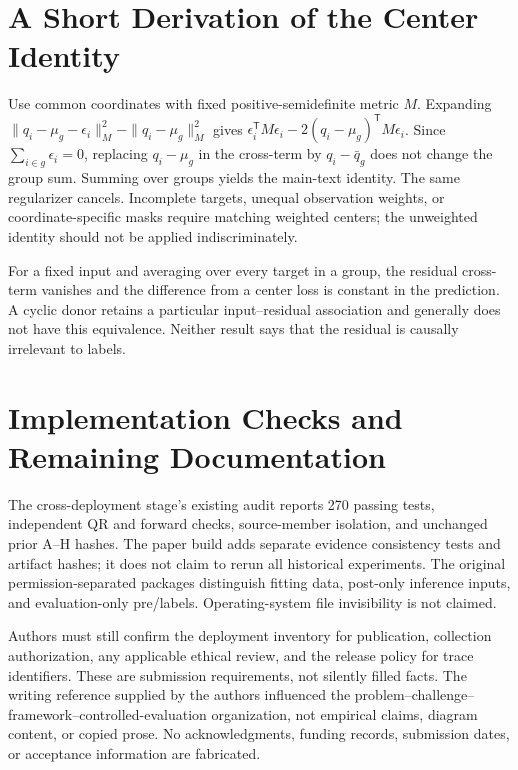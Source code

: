 \documentclass[journal]{IEEEtran}
\begin{document}
\section{A Short Derivation of the Center Identity}
Use common coordinates with fixed positive-semidefinite metric $M$. Expanding $\|q_i-\mu_g-\epsilon_i\|_M^2-\|q_i-\mu_g\|_M^2$ gives $\epsilon_i^{\mathsf T}M\epsilon_i-2(q_i-\mu_g)^{\mathsf T}M\epsilon_i$. Since $\sum_{i\in g}\epsilon_i=0$, replacing $q_i-\mu_g$ in the cross-term by $q_i-\bar q_g$ does not change the group sum. Summing over groups yields the main-text identity. The same regularizer cancels. Incomplete targets, unequal observation weights, or coordinate-specific masks require matching weighted centers; the unweighted identity should not be applied indiscriminately.

For a fixed input and averaging over every target in a group, the residual cross-term vanishes and the difference from a center loss is constant in the prediction. A cyclic donor retains a particular input--residual association and generally does not have this equivalence. Neither result says that the residual is causally irrelevant to labels.

\section{Implementation Checks and Remaining Documentation}
The cross-deployment stage's existing audit reports 270 passing tests, independent QR and forward checks, source-member isolation, and unchanged prior A--H hashes. The paper build adds separate evidence consistency tests and artifact hashes; it does not claim to rerun all historical experiments. The original permission-separated packages distinguish fitting data, post-only inference inputs, and evaluation-only pre/labels. Operating-system file invisibility is not claimed.

Authors must still confirm the deployment inventory for publication, collection authorization, any applicable ethical review, and the release policy for trace identifiers. These are submission requirements, not silently filled facts. The writing reference supplied by the authors influenced the problem--challenge--framework--controlled-evaluation organization, not empirical claims, diagram content, or copied prose. No acknowledgments, funding records, submission dates, or acceptance information are fabricated.
\end{document}
